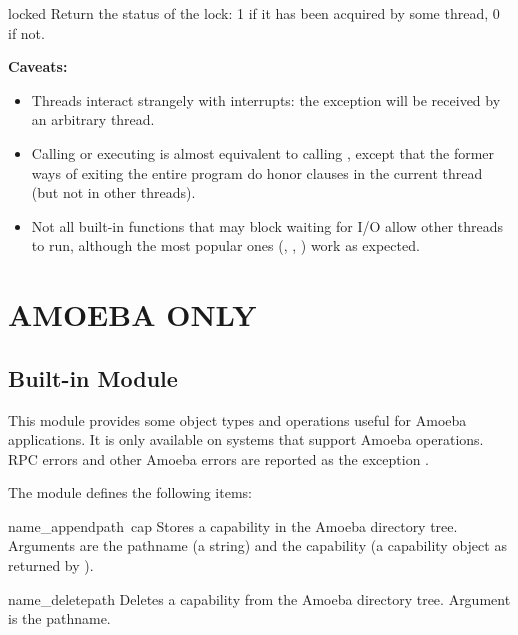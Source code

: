 \begin{funcdesc}{locked}{}
Return the status of the lock: 1 if it has been acquired by some
thread, 0 if not.
\end{funcdesc}

{\bf Caveats:}

\begin{itemize}
\item
Threads interact strangely with interrupts: the
 exception will be received by an arbitrary
thread.

\item
Calling  or executing
 is almost equivalent to calling
, except that the former ways of
exiting the entire program do honor  clauses in the
current thread (but not in other threads).

\item
Not all built-in functions that may block waiting for I/O allow other
threads to run, although the most popular ones (,
, ) work as expected.

\end{itemize}

\chapter{AMOEBA ONLY}

\section{Built-in Module }

This module provides some object types and operations useful for
Amoeba applications.  It is only available on systems that support
Amoeba operations.  RPC errors and other Amoeba errors are reported as
the exception .

The module  defines the following items:

\renewcommand{\indexsubitem}{(in module amoeba)}
\begin{funcdesc}{name_append}{path\, cap}
Stores a capability in the Amoeba directory tree.
Arguments are the pathname (a string) and the capability (a capability
object as returned by
).
\end{funcdesc}

\begin{funcdesc}{name_delete}{path}
Deletes a capability from the Amoeba directory tree.
Argument is the pathname.
\end{funcdesc}

